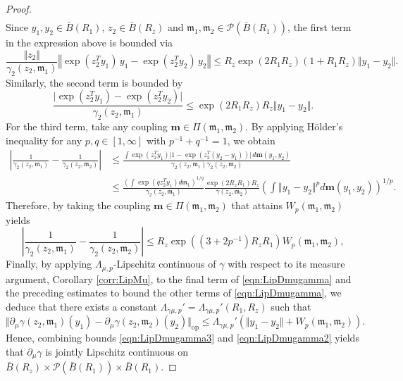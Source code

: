 \documentclass[10pt,a4paper]{amsart}
\begin{document}
\begin{proof}
\begin{align}
\end{align}
Since $y_1,y_2\in \bar B(R_1)$, $z_2\in \bar B(R_z)$ and $\mathfrak{m}_1,\mathfrak{m}_2 \in \mathcal P(\bar B(R_1))$, the first term in the expression above is bounded via
\[
\frac{\Vert z_2\Vert}{\gamma_2(z_2,\mathfrak{m}_1)}\left\Vert \exp(z_2^Ty_1)\,y_1-\exp(z_2^Ty_2)\,y_2\right\Vert\le R_z\exp(2R_1R_z)\left(1+R_1R_z \right)\Vert y_1-y_2\Vert.
\]
Similarly, the second term is bounded by
\[
\frac{\vert \exp(z_2^Ty_1)-\exp(z_2^Ty_2)\vert}{\gamma_2(z_2,\mathfrak{m}_1)}\le \exp(2 R_1R_z)R_z \Vert y_1-y_2\Vert.
\]
For the third term, take any coupling $\bm{m}\in \Pi(\mathfrak{m}_1,\mathfrak{m}_2)$. By applying H\"older's inequality for any $p,q \in [1,\infty]$ with $p^{-1}+q^{-1}=1$, we obtain
\begin{align*}
    \left\vert \frac{1}{\gamma_2(z_2,\mathfrak{m}_1)}-\frac{1}{\gamma_2(z_2,\mathfrak{m}_2)}\right\vert&\le \frac{\int \exp(z_2^Ty_1)\vert 1-\exp(z_2^T(y_2-y_1))\vert\,d \bm{m}(y_1,y_2)}{\gamma_2(z_2,\mathfrak{m}_1)\gamma_2(z_2,\mathfrak{m}_2)}\\&\le\frac{\left(\int \exp(q z_2^Ty_1)d\mathfrak{m}_1\right)^{1/q}}{\gamma_2(z_2,\mathfrak{m}_1)} \frac{\exp(2R_zR_1)R_z}{\gamma(z_2,\mathfrak{m}_2)}\left( \int \Vert y_1-y_2\Vert^p d\bm{m}(y_1,y_2)\right)^{1/p}.
\end{align*}
Therefore, by taking the coupling $\bm{m}\in \Pi(\mathfrak{m}_1,\mathfrak{m}_2)$ that attains $W_p(\mathfrak{m}_1,\mathfrak{m}_2)$ yields
\begin{equation}\label{eqn:Lipinversegamma2}
    \left\vert \frac{1}{\gamma_2(z_2,\mathfrak{m}_1)}-\frac{1}{\gamma_2(z_2,\mathfrak{m}_2)}\right\vert\le R_z\exp((3+2p^{-1}) R_zR_1)W_p(\mathfrak{m}_1,\mathfrak{m}_2),
\end{equation}
Finally, by applying $\Lambda_{\mu,p}$-Lipschitz continuous of $\gamma$ with respect to its measure argument, Corollary \ref{corr:LipMu}, to the final term of \eqref{eqn:LipDmugamma} and the preceding estimates to bound the other terms of \eqref{eqn:LipDmugamma}, we deduce that there exists a constant $\Lambda_{\gamma\mu,p}'=\Lambda_{\gamma\mu,p}'(R_1,R_z)$ such that
\begin{equation}\label{eqn:LipDmugamma2}
    \Vert \partial_\mu\gamma(z_2,\mathfrak{m}_1)(y_1)-\partial_\mu\gamma(z_2,\mathfrak{m}_2)(y_2)\Vert_\mathrm{op}\le\Lambda_{\gamma\mu,p}' \left(\Vert y_1-y_2 \Vert + W_p(\mathfrak{m}_1,\mathfrak{m}_2)\right).
\end{equation}
Hence, combining bounds \eqref{eqn:LipDmugamma3} and \eqref{eqn:LipDmugamma2} yields that $\partial_\mu \gamma$ is jointly Lipschitz continuous on \\$\bar B(R_z)\times \mathcal P(\bar B(R_1)) \times \bar B(R_1)$.
\end{proof}
\end{document}
